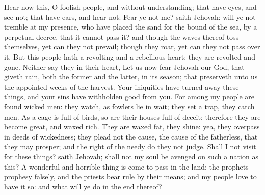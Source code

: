 Hear now this, O foolish people, and without understanding; that have eyes, and see not; that have ears, and hear not: Fear ye not me? saith Jehovah: will ye not tremble at my presence, who have placed the sand for the bound of the sea, by a perpetual decree, that it cannot pass it? and though the waves thereof toss themselves, yet can they not prevail; though they roar, yet can they not pass over it. But this people hath a revolting and a rebellious heart; they are revolted and gone. Neither say they in their heart, Let us now fear Jehovah our God, that giveth rain, both the former and the latter, in its season; that preserveth unto us the appointed weeks of the harvest. Your iniquities have turned away these things, and your sins have withholden good from you. For among my people are found wicked men: they watch, as fowlers lie in wait; they set a trap, they catch men. As a cage is full of birds, so are their houses full of deceit: therefore they are become great, and waxed rich. They are waxed fat, they shine: yea, they overpass in deeds of wickedness; they plead not the cause, the cause of the fatherless, that they may prosper; and the right of the needy do they not judge. Shall I not visit for these things? saith Jehovah; shall not my soul be avenged on such a nation as this?  A wonderful and horrible thing is come to pass in the land: the prophets prophesy falsely, and the priests bear rule by their means; and my people love to have it so: and what will ye do in the end thereof? 

